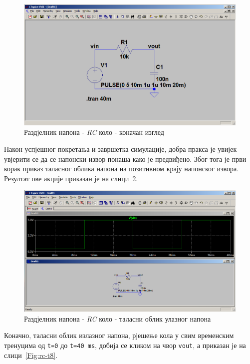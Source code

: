 \begin{figure}[h]
\centering
\includegraphics[width=\figwidth\textwidth]{figs/rc-t6.PNG}
\caption{Раздјелник напона - \textit{RC} коло - коначан изглед}
\label{Fig:rc-t6}
\end{figure}

Након успјешног покретања и завршетка симулације, добра пракса је увијек увјерити се да се напонски извор понаша како је предвиђено. Због тога је први корак приказ таласног облика напона на позитивном крају напонског извора. Резултат ове акције приказан је на слици~\ref{Fig:rc-t7}.

\begin{figure}[h]
\centering
\includegraphics[width=\figwidth\textwidth]{figs/rc-t7.PNG}
\caption{Раздјелник напона - \textit{RC} коло - таласни облик улазног напона}
\label{Fig:rc-t7}
\end{figure}

Коначно, таласни облик излазног напона, рјешење кола у свим временским тренуцима од \texttt{t=0} до \texttt{t=40 ms}, добија се кликом на чвор \texttt{vout}, а приказан је на слици~\ref{Fig:rc-t8}.

